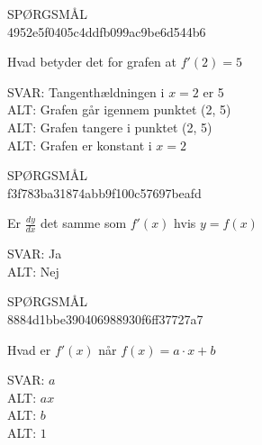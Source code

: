 \documentclass[]{article}
\newenvironment{question}[2]{SPØRGSMÅL\\}{\hspace{50px}}
\newcommand{\answer}[1]{{\color{green} SVAR: #1}\\}
\newcommand{\alt}[1]{{\color{red} ALT: #1}\\}
\begin{document}
	\begin{question}{multi}\id{4952e5f0405c4ddfb099ac9be6d544b6}
		
		Hvad betyder det for grafen at $f'(2)=5$
		
		\answer{Tangenthældningen i $x=2$ er 5}
		\alt{Grafen går igennem punktet (2, 5)}
		\alt{Grafen tangere i punktet (2, 5)}
		\alt{Grafen er konstant i $x=2$}
		
	\end{question}

    \begin{question}{multi}\id{f3f783ba31874abb9f100c57697beafd}
		
		Er $\frac{dy}{dx}$ det samme som $f'(x)$ hvis $y=f(x)$
		
		\answer{Ja}
		\alt{Nej}
		
	\end{question}

    \begin{question}{multi}\id{8884d1bbe390406988930f6ff37727a7}
		
		Hvad er $f'(x)$ når $f(x)=a\cdot x + b$
		
		\answer{$a$}
		\alt{$a x$}
		\alt{$b$}
		\alt{$1$}
		
	\end{question}
\end{document}
